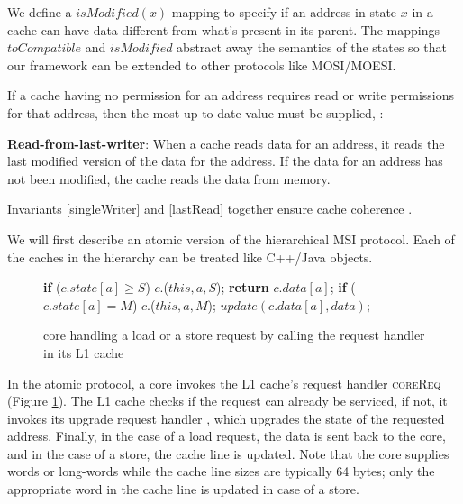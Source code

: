 We define a $isModified(x)$ mapping to specify if an address in state $x$ in a
cache can have data different from what's present in its parent. The mappings
$toCompatible$ and $isModified$ abstract away the semantics of the states so
that our framework can be extended to other protocols like MOSI/MOESI.

If a cache having no permission for an address requires read or write
permissions for that address, then the most up-to-date value must be supplied,
\ie:

\begin{theorem}
\textbf{Read-from-last-writer}: When a cache reads data for an address, it reads
the last modified version of the data for the address. If the data for an
address has not been modified, the cache reads the data from memory.
\label{lastRead}
\end{theorem}

Invariants \ref{singleWriter} and \ref{lastRead} together ensure cache coherence
\cite{Patterson}.

We will first describe an atomic version of the hierarchical MSI protocol. Each
of the caches in the hierarchy can be treated like C++/Java objects.

\begin{figure}
\small
\begin{algorithmic}
    \State \textbf{if} ($c.state[a] \ge S$)
    \State \;\;\;\; \call{} $c.$\uReq($this, a, S$);
    \State \textbf{return} $c.data[a]$;
    \State \textbf{if} ($c.state[a] = M$)
    \State \;\;\;\; \call{} $c.$\uReq($this, a, M$);
    \State $update(c.data[a], data)$;
  \EndIf
\EndProc
\end{algorithmic}
\caption{core handling a load or a store request by calling the request
handler in its L1 cache}
\label{coreHandle}
\end{figure}

In the atomic protocol, a core invokes the L1 cache's request handler
\textsc{coreReq} (Figure \ref{coreHandle}). The L1 cache checks if the request
can already be serviced, if not, it invokes its upgrade request handler \uReq{},
which upgrades the state of the requested address. Finally, in the case of a
load request, the data is sent back to the core, and in the case of a store, the
cache line is updated. Note that the core supplies words or long-words while the
cache line sizes are typically 64 bytes; only the appropriate word in the cache
line is updated in case of a store.

